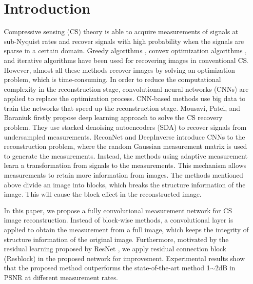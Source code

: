 \documentclass[review]{elsarticle}
\begin{document}
\section{Introduction}\label{Introduction}
Compressive sensing (CS) theory \cite{baraniuk2010model,baraniuk2011more,candes2007sparsity,haupt2010toeplitz} is able to acquire measurements of signals at sub-Nyquist rates and recover signals with high probability when the signals are sparse in a certain domain. Greedy algorithms \cite{needell2010cosamp,babacan2010bayesian}, convex optimization algorithms \cite{candes2005decoding,figueiredo2007gradient}, and iterative algorithms \cite{donoho2009message,daubechies2004iterative} have been used for recovering images in conventional CS. However, almost all these methods recover images by solving an optimization problem, which is time-consuming.
In order to reduce the computational complexity in the reconstruction stage, convolutional neural networks (CNNs) are applied to replace the optimization process. CNN-based methods \cite{mousavi2015deep,kulkarni2016reconnet,mousavi2017learning,mousavi2017deepcodec,xie2017adaptive} use big data \cite{stevens2017} to train the networks that speed up the reconstruction stage. Mousavi, Patel, and Baraniuk \cite{mousavi2015deep} firstly propose deep learning approach to solve the CS recovery problem. They use stacked denoising autoencoders (SDA) to recover signals from undersampled measurements. ReconNet \cite{kulkarni2016reconnet} and DeepInverse \cite{mousavi2017learning} introduce CNNs to the reconstruction problem, where the random Gaussian measurement matrix is used to generate the measurements. Instead, the methods \cite{mousavi2017deepcodec,xie2017adaptive} using adaptive measurement learn a transformation from signals to the measurements. This mechanism allows measurements to retain more information from images. The methods mentioned above divide an image into blocks, which breaks the structure information of the image. This will cause the block effect in the reconstructed image.

In this paper, we propose a fully convolutional measurement network for CS image reconstruction. Instead of block-wise methods, a convolutional layer is applied to obtain the measurement from a full image, which keeps the integrity of structure information of the original image. Furthermore, motivated by the residual learning proposed by ResNet \cite{he2016deep}, we apply residual connection block (Resblock) in the proposed network for improvement. Experimental results show that the proposed method outperforms the state-of-the-art method 1$\sim$2dB in PSNR at different measurement rates.
\end{document}
